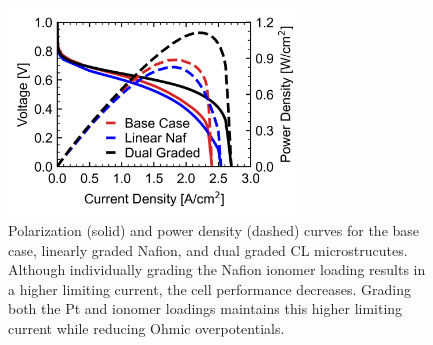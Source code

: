 \documentclass[final,3p,times,twocolumn]{elsarticle}    %
\newcommand{\crr}[1]{\color{red} #1 \color{black}}
\begin{document}

\begin{figure}[!tb]
    \centering
    \includegraphics[width=3.07in]{figures_uniform/dual-grad-3_07.png}
    \crr{
    \caption{Polarization (solid) and power density (dashed) curves for the base case, linearly graded Nafion, and dual graded CL microstrucutes. Although individually grading the Nafion ionomer loading results in a higher limiting current, the cell performance decreases. Grading both the Pt and ionomer loadings maintains this higher limiting current while reducing Ohmic overpotentials.}}
    \label{fig:dual-graded}
\end{figure}
\end{document}
